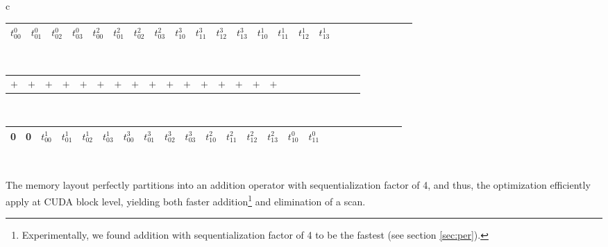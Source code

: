 \begin{center}
  \small
  \begin{tabular}{c}
    \begin{tabular}{|C{0.4cm}|C{0.4cm}|C{0.4cm}|C{0.4cm}|C{0.4cm}|C{0.4cm}|C{0.4cm}|C{0.4cm}|C{0.4cm}|C{0.4cm}|C{0.4cm}|C{0.4cm}|C{0.4cm}|C{0.4cm}|C{0.4cm}|C{0.4cm}|C{0.4cm}|C{0.4cm}|C{0.4cm}|C{0.4cm}|C{0.4cm}|C{0.4cm}|C{0.4cm}|C{0.4cm}|}
      \hline
      \color{Crimson}$t^0_{00}$ & \color{Crimson}$t^0_{01}$ & \color{Crimson}$t^0_{02}$ & \color{Crimson}$t^0_{03}$ & \color{ForestGreen}$t^2_{00}$ & \color{ForestGreen}$t^2_{01}$ & \color{ForestGreen}$t^2_{02}$ & \color{ForestGreen}$t^2_{03}$ & \color{Chocolate}$t^3_{10}$ & \color{Chocolate}$t^3_{11}$ & \color{Chocolate}$t^3_{12}$ & \color{Chocolate}$t^3_{13}$ & \color{RoyalBlue}$t^1_{10}$ & \color{RoyalBlue}$t^1_{11}$ & \color{RoyalBlue}$t^1_{12}$ & \color{RoyalBlue}$t^1_{13}$\\
      \hline
    \end{tabular}\\
    \begin{tabular}{C{0.41cm}C{0.41cm}C{0.41cm}C{0.41cm}C{0.41cm}C{0.41cm}C{0.41cm}C{0.41cm}C{0.41cm}C{0.41cm}C{0.41cm}C{0.41cm}C{0.41cm}C{0.41cm}C{0.41cm}C{0.41cm}C{0.41cm}C{0.41cm}C{0.41cm}C{0.41cm}C{0.41cm}C{0.41cm}C{0.41cm}C{0.41cm}}
      $+$ & $+$ & $+$ & $+$  & $+$ & $+$ & $+$ & $+$  & $+$ & $+$ & $+$ & $+$  & $+$ & $+$ & $+$ & $+$
    \end{tabular}\\
    \begin{tabular}{|C{0.4cm}|C{0.4cm}|C{0.4cm}|C{0.4cm}|C{0.4cm}|C{0.4cm}|C{0.4cm}|C{0.4cm}|C{0.4cm}|C{0.4cm}|C{0.4cm}|C{0.4cm}|C{0.4cm}|C{0.4cm}|C{0.4cm}|C{0.4cm}|C{0.4cm}|C{0.4cm}|C{0.4cm}|C{0.4cm}|C{0.4cm}|C{0.4cm}|C{0.4cm}|C{0.4cm}|}
       & 0 & \color{RoyalBlue}$t^1_{00}$ & \color{RoyalBlue}$t^1_{01}$ & \color{RoyalBlue}$t^1_{02}$ & \color{RoyalBlue}$t^1_{03}$ & \color{Chocolate}$t^3_{00}$ & \color{Chocolate}$t^3_{01}$ & \color{Chocolate}$t^3_{02}$ & \color{Chocolate}$t^3_{03}$ & \color{ForestGreen}$t^2_{10}$ & \color{ForestGreen}$t^2_{11}$ & \color{ForestGreen}$t^2_{12}$ & \color{ForestGreen}$t^2_{13}$ & \color{Crimson}$t^0_{10}$ & \color{Crimson}$t^0_{11}$\\
      \hline
    \end{tabular}
  \end{tabular}
\end{center}~

The memory layout perfectly partitions into an addition operator with
sequentialization factor of 4, and thus, the optimization efficiently apply at
CUDA block level, yielding both faster addition\footnote{Experimentally, we
  found addition with sequentialization factor of 4 to be the fastest (see
  section \ref{sec:per}).} and elimination of a scan.

